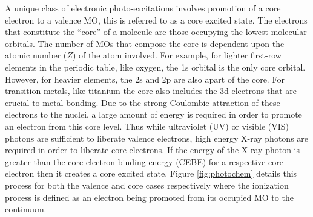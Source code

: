 \documentclass[final]{emory}
\begin{document}
A unique class of electronic photo-excitations involves promotion of a core electron to a valence MO, this is referred to as a core excited state. The electrons that constitute the ``core'' of a molecule are those occupying the lowest molecular orbitals. The number of MOs that compose the core is dependent upon the atomic number ($Z$) of the atom involved. For example, for lighter first-row elements in the periodic table, like oxygen, the 1s orbital is the only core orbital. However, for heavier elements, the 2s and 2p are also apart of the core. For transition metals, like titanium the core also includes the 3d electrons that are crucial to metal bonding. Due to the strong Coulombic attraction of these electrons to the nuclei, a large amount of energy is required in order to promote an electron from this core level. Thus while ultraviolet (UV) or visible (VIS) photons are sufficient to liberate valence electrons, high energy X-ray photons are required in order to liberate core electrons. If the energy of the X-ray photon is greater than the core electron binding energy (CEBE) for a respective core electron then it creates a core excited state. Figure \ref{fig:photochem} details this process for both the valence and core cases respectively where the ionization process is defined as an electron being promoted from its occupied MO to the continuum.
\end{document}
